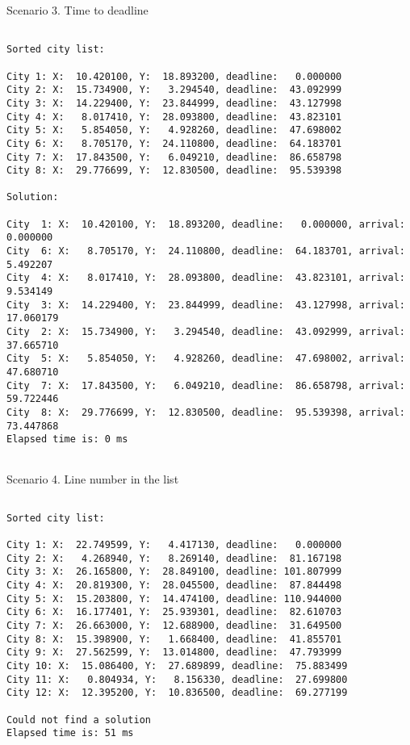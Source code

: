 \documentclass[a4paper, 12pt]{article}
\begin{document}
Scenario 3. Time to deadline

\begin{lstlisting}

Sorted city list:

City 1: X:  10.420100, Y:  18.893200, deadline:   0.000000
City 2: X:  15.734900, Y:   3.294540, deadline:  43.092999
City 3: X:  14.229400, Y:  23.844999, deadline:  43.127998
City 4: X:   8.017410, Y:  28.093800, deadline:  43.823101
City 5: X:   5.854050, Y:   4.928260, deadline:  47.698002
City 6: X:   8.705170, Y:  24.110800, deadline:  64.183701
City 7: X:  17.843500, Y:   6.049210, deadline:  86.658798
City 8: X:  29.776699, Y:  12.830500, deadline:  95.539398

Solution: 

City  1: X:  10.420100, Y:  18.893200, deadline:   0.000000, arrival:   0.000000
City  6: X:   8.705170, Y:  24.110800, deadline:  64.183701, arrival:   5.492207
City  4: X:   8.017410, Y:  28.093800, deadline:  43.823101, arrival:   9.534149
City  3: X:  14.229400, Y:  23.844999, deadline:  43.127998, arrival:  17.060179
City  2: X:  15.734900, Y:   3.294540, deadline:  43.092999, arrival:  37.665710
City  5: X:   5.854050, Y:   4.928260, deadline:  47.698002, arrival:  47.680710
City  7: X:  17.843500, Y:   6.049210, deadline:  86.658798, arrival:  59.722446
City  8: X:  29.776699, Y:  12.830500, deadline:  95.539398, arrival:  73.447868
Elapsed time is: 0 ms


\end{lstlisting}

Scenario 4. Line number in the list

\begin{lstlisting}

Sorted city list:

City 1: X:  22.749599, Y:   4.417130, deadline:   0.000000
City 2: X:   4.268940, Y:   8.269140, deadline:  81.167198
City 3: X:  26.165800, Y:  28.849100, deadline: 101.807999
City 4: X:  20.819300, Y:  28.045500, deadline:  87.844498
City 5: X:  15.203800, Y:  14.474100, deadline: 110.944000
City 6: X:  16.177401, Y:  25.939301, deadline:  82.610703
City 7: X:  26.663000, Y:  12.688900, deadline:  31.649500
City 8: X:  15.398900, Y:   1.668400, deadline:  41.855701
City 9: X:  27.562599, Y:  13.014800, deadline:  47.793999
City 10: X:  15.086400, Y:  27.689899, deadline:  75.883499
City 11: X:   0.804934, Y:   8.156330, deadline:  27.699800
City 12: X:  12.395200, Y:  10.836500, deadline:  69.277199

Could not find a solution
Elapsed time is: 51 ms



\end{lstlisting}
\end{document}
